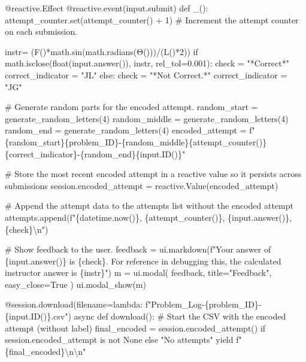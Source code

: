 \documentclass[
  letterpaper,
  DIV=11,
  numbers=noendperiod]{scrreprt}
\newenvironment{Shaded}{\begin{snugshade}}{\end{snugshade}}
\newcommand{\NormalTok}[1]{\textcolor[rgb]{0.00,0.23,0.31}{#1}}
\begin{document}
\begin{Shaded}
\begin{Highlighting}[]
\NormalTok{    @reactive.Effect}
\NormalTok{    @reactive.event(input.submit)}
\NormalTok{    def \_():}
\NormalTok{        attempt\_counter.set(attempt\_counter() + 1)  \# Increment the attempt counter on each submission.}
    
\NormalTok{        instr= (F()*math.sin(math.radians(Θ()))/(L()*2))}
\NormalTok{        if math.isclose(float(input.answer()), instr, rel\_tol=0.001):}
\NormalTok{            check = "*Correct*"}
\NormalTok{            correct\_indicator = "JL"}
\NormalTok{        else:}
\NormalTok{            check = "*Not Correct.*"}
\NormalTok{            correct\_indicator = "JG"}

\NormalTok{        \# Generate random parts for the encoded attempt.}
\NormalTok{        random\_start = generate\_random\_letters(4)}
\NormalTok{        random\_middle = generate\_random\_letters(4)}
\NormalTok{        random\_end = generate\_random\_letters(4)}
\NormalTok{        encoded\_attempt = f"\{random\_start\}\{problem\_ID\}{-}\{random\_middle\}\{attempt\_counter()\}\{correct\_indicator\}{-}\{random\_end\}\{input.ID()\}"}

\NormalTok{        \# Store the most recent encoded attempt in a reactive value so it persists across submissions}
\NormalTok{        session.encoded\_attempt = reactive.Value(encoded\_attempt)}

\NormalTok{        \# Append the attempt data to the attempts list without the encoded attempt}
\NormalTok{        attempts.append(f"\{datetime.now()\}, \{attempt\_counter()\}, \{input.answer()\}, \{check\}\textbackslash{}n")}

\NormalTok{        \# Show feedback to the user.}
\NormalTok{        feedback = ui.markdown(f"Your answer of \{input.answer()\} is \{check\}. For reference in debugging this, the calculated instructor answer is \{instr\}")}
\NormalTok{        m = ui.modal(}
\NormalTok{            feedback,}
\NormalTok{            title="Feedback",}
\NormalTok{            easy\_close=True}
\NormalTok{        )}
\NormalTok{        ui.modal\_show(m)}

\NormalTok{    @session.download(filename=lambda: f"Problem\_Log{-}\{problem\_ID\}{-}\{input.ID()\}.csv")}
\NormalTok{    async def download():}
\NormalTok{        \# Start the CSV with the encoded attempt (without label)}
\NormalTok{        final\_encoded = session.encoded\_attempt() if session.encoded\_attempt is not None else "No attempts"}
\NormalTok{        yield f"\{final\_encoded\}\textbackslash{}n\textbackslash{}n"}
        

\end{Highlighting}
\end{Shaded}
\end{document}
